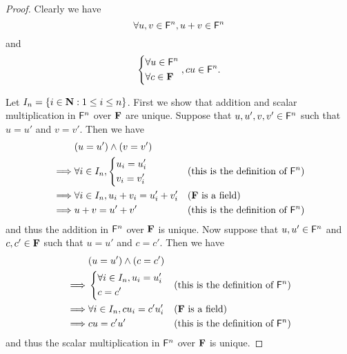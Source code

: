 \begin{proof}
    Clearly we have
    \[
        \forall u, v \in \mathsf{F}^{n}, u + v \in \mathsf{F}^{n}
    \]
    and
    \[
        \begin{dcases}
            \forall u \in \mathsf{F}^{n} \\
            \forall c \in \mathbf{F}
        \end{dcases}, cu \in \mathsf{F}^{n}.
    \]

    Let \(I_{n} = \left\lbrace i \in \mathbf{N} : 1 \leq i \leq n\right\rbrace\).
    First we show that addition and scalar multiplication in \(\mathsf{F}^{n}\) over \(\mathbf{F}\) are unique.
    Suppose that \(u, u', v, v' \in \mathsf{F}^{n}\) such that \(u = u'\) and \(v = v'\).
    Then we have
    \begin{align*}
                 & \p{u = u'} \land \p{v = v'}                                                                                 \\
        \implies & \forall i \in I_{n}, \begin{dcases}
            u_{i} = u_{i}' \\
            v_{i} = v_{i}'
        \end{dcases}       &  & \text{(this is the definition of \(\vs{F}^{n}\))} \\
        \implies & \forall i \in I_{n}, u_{i} + v_{i} = u_{i}' + v_{i}' &  & \text{(\(\F\) is a field)}                        \\
        \implies & u + v = u' + v'                                      &  & \text{(this is the definition of \(\vs{F}^{n}\))}
    \end{align*}
    and thus the addition in \(\mathsf{F}^{n}\) over \(\mathbf{F}\) is unique.
    Now suppose that \(u, u' \in \mathsf{F}^{n}\) and \(c, c' \in \mathbf{F}\) such that \(u = u'\) and \(c = c'\).
    Then we have
    \begin{align*}
                 & \p{u = u'} \land \p{c = c'}                                                                     \\
        \implies & \begin{dcases}
            \forall i \in I_{n}, u_{i} = u_{i}' \\
            c = c'
        \end{dcases}                &  & \text{(this is the definition of \(\vs{F}^{n}\))} \\
        \implies & \forall i \in I_{n}, c u_{i} = c' u_{i}' &  & \text{(\(\F\) is a field)}                        \\
        \implies & cu = c' u'                               &  & \text{(this is the definition of \(\vs{F}^{n}\))}
    \end{align*}
    and thus the scalar multiplication in \(\mathsf{F}^{n}\) over \(\mathbf{F}\) is unique.


\end{proof}
